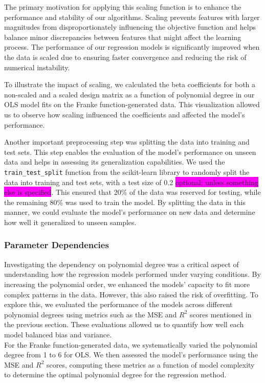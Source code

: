 \documentclass[aps,pra,english,notitlepage,reprint,nofootinbib]{revtex4-1}  %
\begin{document}
The primary motivation for applying this scaling function is to enhance the performance and stability of our algorithms. Scaling prevents features with larger magnitudes from disproportionately influencing the objective function and helps balance minor discrepancies between features that might affect the learning process. The performance of our regression models is significantly improved when the data is scaled due to ensuring faster convergence and reducing the risk of numerical instability.

To illustrate the impact of scaling, we calculated the beta coefficients for both a non-scaled and a scaled design matrix as a function of polynomial degree in our OLS model fits on the Franke function-generated data. This visualization allowed us to observe how scaling influenced the coefficients and affected the model's performance.

Another important preprocessing step was splitting the data into training and test sets. This step enables the evaluation of the model's performance on unseen data and helps in assessing its generalization capabilities. We used the \verb|train_test_split| function from the scikit-learn library to randomly split the data into training and test sets, with a test size of 0.2 \colorbox{magenta}{optional: unless something else is specified}. This ensured that 20\% of the data was reserved for testing, while the remaining 80\% was used to train the model. By splitting the data in this manner, we could evaluate the model's performance on new data and determine how well it generalized to unseen samples.

\subsubsection{Parameter Dependencies}
Investigating the dependency on polynomial degree was a critical aspect of understanding how the regression models performed under varying conditions. By increasing the polynomial order, we enhanced the models' capacity to fit more complex patterns in the data. However, this also raised the risk of overfitting. To explore this, we evaluated the performance of the models across different polynomial degrees using metrics such as the MSE and $R^2$ scores mentioned in the previous section. These evaluations allowed us to quantify how well each model balanced bias and variance. \\

For the Franke function-generated data, we systematically varied the polynomial degree from 1 to 6 for OLS. We then assessed the model's performance using the MSE and $R^2$ scores, computing these metrics as a function of model complexity to determine the optimal polynomial degree for the regression method.\\
\end{document}
